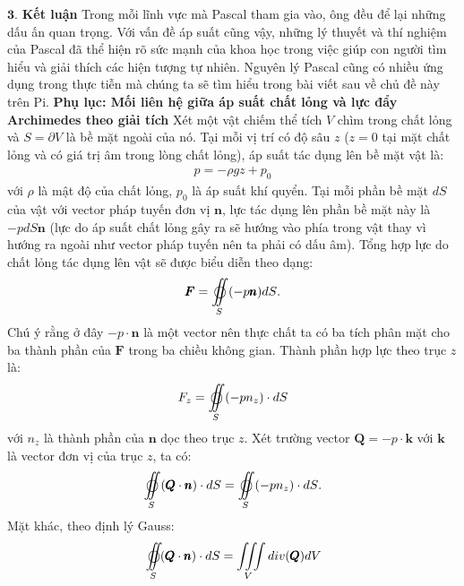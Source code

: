 \begin{multicols}{2}
	\vskip 0.1cm
	$\pmb{3.}$ \textbf{\color{timhieukhoahoc}Kết luận}
	\vskip 0.1cm
	Trong mỗi lĩnh vực mà Pascal tham gia vào, ông đều để lại những dấu ấn quan trọng. Với vấn đề áp suất cũng vậy, những lý  thuyết và thí nghiệm của Pascal đã thể hiện rõ sức mạnh của khoa học trong việc giúp con người tìm hiểu và giải thích các hiện tượng tự nhiên. Nguyên lý Pascal cũng có nhiều ứng dụng trong thực tiễn mà chúng ta sẽ tìm hiểu trong bài viết sau về chủ đề này trên Pi.
	\vskip 0.1cm
	\textbf{\color{timhieukhoahoc}Phụ lục: Mối liên hệ giữa áp suất chất lỏng và lực đẩy Archimedes theo giải tích}
	\vskip 0.1cm
	Xét một vật chiếm thể tích $V$ chìm trong chất lỏng và $S=\partial V$ là bề mặt ngoài của nó. Tại mỗi vị trí có độ sâu $z$ ($z=0$ tại mặt chất lỏng và có giá trị âm trong lòng chất lỏng), áp suất tác dụng lên bề mặt vật là:
	\begin{align*}
		p = - \rho gz + p_0
	\end{align*}
	với $\rho$ là mật độ của chất lỏng, $p_0$ là áp suất khí quyển.
	\vskip 0.1cm
	Tại mỗi phần bề mặt $dS$ của vật với vector pháp tuyến đơn vị $\pmb{n}$, lực tác dụng lên phần bề mặt này là $-p dS \pmb{n}$ (lực do áp suất chất lỏng gây ra sẽ hướng vào phía trong vật thay vì hướng ra ngoài như vector pháp tuyến nên ta phải có dấu âm). Tổng hợp lực do chất lỏng tác dụng lên vật sẽ được biểu diễn theo dạng:
	\begin{align*}
		\pmb{F} = \mathop{{\int\!\!\!\!\!\int}\mkern-21mu \bigcirc}\limits_S 
		{( - p\pmb{n})dS}.
	\end{align*}
	Chú ý rằng ở đây $-p\cdot \pmb{n}$ là một vector nên thực chất ta có ba tích phân mặt cho ba thành phần của $\pmb{F}$ trong ba chiều không gian.
	\vskip 0.1cm
	Thành phần hợp lực theo trục $z$ là:
	\begin{align*}
		{F_z} = \mathop{{\int\!\!\!\!\!\int}\mkern-21mu \bigcirc}\limits_S 
		{( - p{n_z}) \cdot dS}
	\end{align*}	
	với $n_z$ là thành phần của $\pmb{n}$ dọc theo trục $z$.
	\vskip 0.1cm
	Xét trường vector $\pmb{Q}=-p\cdot \pmb{k}$ với $\pmb{k}$ là vector đơn vị của trục $z$, ta có:
	\begin{align*}
		\mathop{{\int\!\!\!\!\!\int}\mkern-21mu \bigcirc}\limits_S 
		{(\pmb{Q} \cdot \pmb{n}) \cdot dS = \mathop{{\int\!\!\!\!\!\int}\mkern-21mu \bigcirc}\limits_S 
			{( - p{n_z}) \cdot dS} }.
	\end{align*}
	Mặt khác, theo định lý  Gauss:
	\begin{align*}
		&\mathop{{\int\!\!\!\!\!\int}\mkern-21mu \bigcirc}\limits_S 
		(\pmb{Q} \cdot \pmb{n}) \cdot dS = \iiint\limits_V div(\pmb{Q})dV \\

\end{align*}
\end{multicols}

